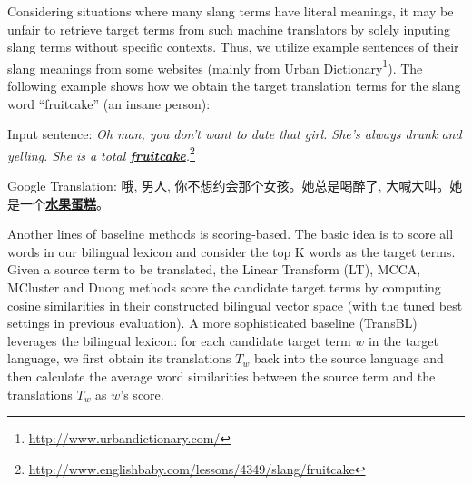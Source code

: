 Considering situations where many slang terms have literal meanings, it may be unfair to retrieve target terms from such machine translators by solely inputing slang terms without specific contexts. 
Thus, we utilize example sentences of their slang meanings from some websites (mainly from Urban 
Dictionary\footnote{\scriptsize {\url{http://www.urbandictionary.com/}}}). 
The following example shows how we obtain the target translation terms for the slang word ``fruitcake'' (an insane person):

Input sentence: {\textit{Oh man, you don't want to date that girl. She's always drunk and yelling. She is a total \underline{\textbf{fruitcake}}.}}\footnote{\scriptsize {\url{http://www.englishbaby.com/lessons/4349/slang/fruitcake}}} 


{Google Translation:}
{\small 哦, 男人, 你不想约会那个女孩。她总是喝醉了, 大喊大叫。她是一个\underline{\textbf{水果蛋糕}}。}

Another lines of baseline methods is scoring-based.
The basic idea is to score all words in our bilingual lexicon and consider the top K words as the target terms. 
Given a source term to be translated,  the Linear Transform (LT), MCCA, MCluster and Duong methods score the candidate target terms by 
computing cosine similarities in their constructed bilingual vector space (with the tuned best settings in previous evaluation). 
A more sophisticated baseline (TransBL) leverages the bilingual lexicon: 
for each candidate target term $w$ in the target language, we first obtain its translations $T_w$ back into the source language and then calculate the average word similarities between the source term and the translations $T_w$ as $w$'s score. 

